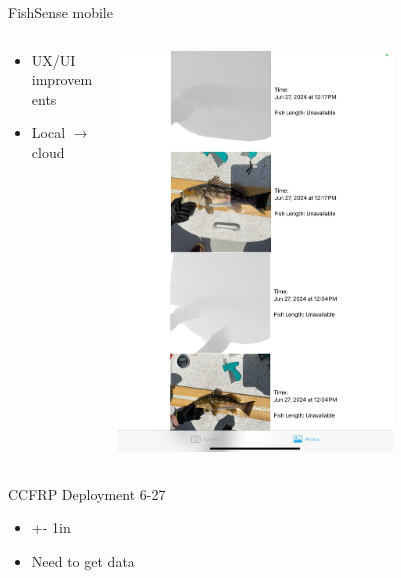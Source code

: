 \begin{frame}{FishSense mobile}
    \begin{columns}
        \begin{column}{0.5\textwidth}
            \begin{itemize}
                \item UX/UI improvements
                \item Local $\rightarrow$ cloud
            \end{itemize}
        \end{column}
        \begin{column}{0.5\textwidth}
            \centering
            \includegraphics[height=0.7\textheight,width=0.7\textwidth,keepaspectratio]{images/fs_app.png}
        \end{column}
    \end{columns}
\end{frame}

\begin{frame}{CCFRP Deployment 6-27}
    \begin{itemize}
        \item +- 1in
        \item Need to get data
    \end{itemize}
\end{frame}

